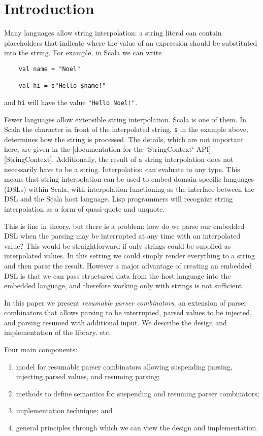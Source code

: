 \section{Introduction}

   Many languages allow string interpolation: a string literal can contain placeholders that indicate where the value of an expression should be substituted into the string. For example, in Scala we can write

  \begin{lstlisting}
    val name = "Noel"

    val hi = s"Hello $name!"
  \end{lstlisting}

  and \lstinline{hi} will have the value \lstinline{"Hello Noel!"}.

  Fewer languages allow extensible string interpolation. Scala is one of them. In Scala the character in front of the interpolated string, \texttt{s} in the example above, determines how the string is processed. The details, which are not important here, are given in the [documentation for the `StringContext` API][StringContext]. Additionally, the result of a string interpolation does not necessarily have to be a string. Interpolation can evaluate to any type. This means that string interpolation can be used to embed domain specific languages (DSLs) within Scala, with interpolation functioning as the interface between the DSL and the Scala host language. Lisp programmers will recognize string interpolation as a form of quasi-quote and unquote.

  This is fine in theory, but there is a problem: how do we parse our embedded DSL when the parsing may be interrupted at any time with an interpolated value? This would be straightforward if only strings could be supplied as interpolated values. In this setting we could simply render everything to a string and then parse the result. However a major advantage of creating an embedded DSL is that we can pass structured data from the host language into the embedded language, and therefore working only with strings is not sufficient.

  In this paper we present \emph{resumable parser combinators}, an extension of parser combinators that allows parsing to be interrupted, parsed values to be injected, and parsing resumed with additional input. We describe the design and implementation of the library. etc.

Four main components:

\begin{enumerate}
  \item model for resumable parser combinators allowing suspending parsing, injecting parsed values, and resuming parsing;
  \item methods to define semantics for suspending and resuming parser combinators;
  \item implementation technique; and
  \item general principles through which we can view the design and implementation.
\end{enumerate}
